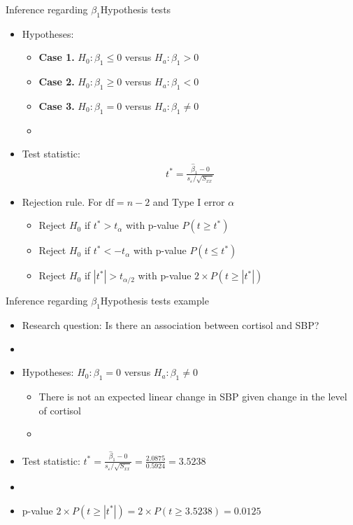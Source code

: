 \documentclass[xcolor=dvipsnames]{beamer}
\begin{document}
\begin{frame}{Inference regarding $\beta_1$}{Hypothesis tests}
	\begin{itemize}
		\item Hypotheses: \pause
		\begin{itemize}
			\item \textbf{Case 1.} $H_0: \beta_1 \leq 0$ versus $H_a: \beta_1 > 0$\pause
			\item \textbf{Case 2.} $H_0: \beta_1 \geq 0$ versus $H_a: \beta_1 < 0$\pause
			\item \textbf{Case 3.} $H_0: \beta_1 = 0$ versus $H_a: \beta_1 \neq 0$\pause
			\item[]
		\end{itemize}
	\item Test statistic:\pause
	\begin{gather*}
		t^*=\frac{\hat{\beta}_1-0}{s_{\varepsilon} / \sqrt{S_{xx}}}
	\end{gather*}\pause
	\item Rejection rule. For $\text{df} = n-2$ and Type I error $\alpha$\pause
	\begin{itemize}
		\item Reject $H_0$ if $t^* > t_{\alpha}$ with p-value $P(t \geq t^*)$\pause
		\item Reject $H_0$ if $t^* < -t_{\alpha}$ with p-value $P(t \leq t^*)$\pause
		\item Reject $H_0$ if $|t^*| > t_{\alpha / 2}$ with p-value $2\times P(t \geq |t^*|)$
	\end{itemize}
	\end{itemize}
\end{frame}

\begin{frame}{Inference regarding $\beta_1$}{Hypothesis tests example}
	\begin{itemize}
		\item Research question: Is there an association between cortisol and SBP? \pause
		\item[]
		\item Hypotheses: $H_0: \beta_1 = 0$ versus $H_a: \beta_1 \neq 0$ \pause
		\begin{itemize}
			\item There is not an expected linear change in SBP given change in the level of cortisol \pause
			\item[]
		\end{itemize}
		\item Test statistic: $t^*=\frac{\hat{\beta}_1-0}{s_{\varepsilon} / \sqrt{S_{xx}}}= \frac{2.0875}{0.5924}=3.5238$ \pause
		\item[]
		\item p-value $2\times P(t \geq |t^*|) = 2 \times P(t \geq 3.5238) = 0.0125$
	\end{itemize}
\end{frame}
\end{document}
